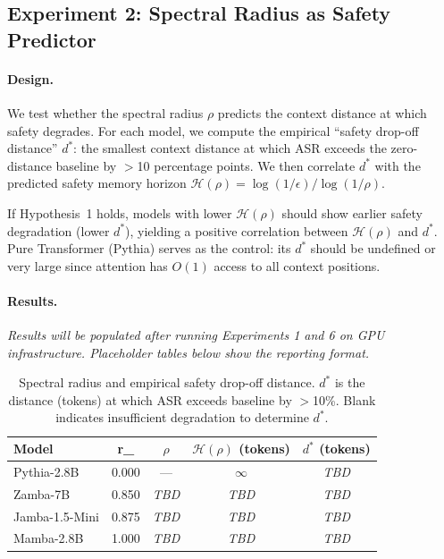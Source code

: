 \documentclass{article}
\newcommand{\rSSM}{r_{\mathrm{SSM}}}
\newcommand{\Horizon}{\mathcal{H}(\rho)}
\begin{document}
\subsection{Experiment 2: Spectral Radius as Safety Predictor}
\label{sec:exp2}

\paragraph{Design.}
We test whether the spectral radius $\rho$ predicts the context distance at which safety
degrades. For each model, we compute the empirical ``safety drop-off distance'' $d^*$:
the smallest context distance at which ASR exceeds the zero-distance baseline by
$>$10 percentage points. We then correlate $d^*$ with the predicted safety memory horizon
$\Horizon = \log(1/\epsilon)/\log(1/\rho)$.

If Hypothesis~1 holds, models with lower $\Horizon$ should show earlier safety degradation
(lower $d^*$), yielding a positive correlation between $\Horizon$ and $d^*$.
Pure Transformer (Pythia) serves as the control: its $d^*$ should be undefined or
very large since attention has $O(1)$ access to all context positions.

\paragraph{Results.}
\emph{Results will be populated after running Experiments 1 and 6 on GPU infrastructure.
Placeholder tables below show the reporting format.}

\begin{table}[ht]
  \centering
  \caption{Spectral radius and empirical safety drop-off distance. $d^*$ is the distance
           (tokens) at which ASR exceeds baseline by $>$10\%. Blank indicates insufficient
           degradation to determine $d^*$.}
  \label{tab:spectral-predictor}
  \begin{tabular}{lcccc}
    \toprule
    \textbf{Model} & \rSSM{} & $\hat{\rho}$ & $\Horizon$ (tokens) & $d^*$ (tokens) \\
    \midrule
    Pythia-2.8B    & 0.000 & --- & $\infty$ & \emph{TBD} \\
    Zamba-7B       & 0.850 & \emph{TBD} & \emph{TBD} & \emph{TBD} \\
    Jamba-1.5-Mini & 0.875 & \emph{TBD} & \emph{TBD} & \emph{TBD} \\
    Mamba-2.8B     & 1.000 & \emph{TBD} & \emph{TBD} & \emph{TBD} \\
    \bottomrule
  \end{tabular}
\end{table}
\end{document}

